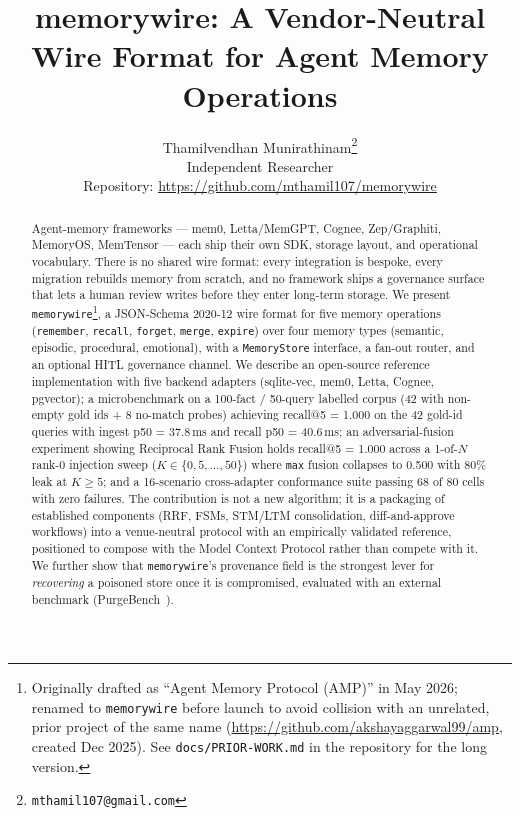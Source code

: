 \documentclass[11pt,letterpaper,twocolumn]{article}
\title{memorywire: A Vendor-Neutral Wire Format for Agent Memory Operations}
\author{
  Thamilvendhan Munirathinam\thanks{\texttt{mthamil107@gmail.com}}\\
  Independent Researcher\\
  \small{Repository: \url{https://github.com/mthamil107/memorywire}}
}
\date{}
\begin{document}
\maketitle

\begin{abstract}
Agent-memory frameworks --- mem0, Letta/MemGPT, Cognee, Zep/Graphiti, MemoryOS, MemTensor --- each ship their own SDK, storage layout, and operational vocabulary. There is no shared wire format: every integration is bespoke, every migration rebuilds memory from scratch, and no framework ships a governance surface that lets a human review writes before they enter long-term storage. We present \texttt{memorywire}\footnote{Originally drafted as ``Agent Memory Protocol (AMP)'' in May 2026; renamed to \texttt{memorywire} before launch to avoid collision with an unrelated, prior project of the same name (\url{https://github.com/akshayaggarwal99/amp}, created Dec 2025). See \texttt{docs/PRIOR-WORK.md} in the repository for the long version.}, a JSON-Schema 2020-12 wire format for five memory operations (\texttt{remember}, \texttt{recall}, \texttt{forget}, \texttt{merge}, \texttt{expire}) over four memory types (semantic, episodic, procedural, emotional), with a \texttt{MemoryStore} interface, a fan-out router, and an optional HITL governance channel. We describe an open-source reference implementation with five backend adapters (sqlite-vec, mem0, Letta, Cognee, pgvector); a microbenchmark on a 100-fact / 50-query labelled corpus (42 with non-empty gold ids + 8 no-match probes) achieving recall@5 = 1.000 on the 42 gold-id queries with ingest p50 = 37.8\,ms and recall p50 = 40.6\,ms; an adversarial-fusion experiment showing Reciprocal Rank Fusion holds recall@5 = 1.000 across a 1-of-$N$ rank-0 injection sweep ($K \in \{0,5,\dots,50\}$) where \texttt{max} fusion collapses to 0.500 with 80\% leak at $K \geq 5$; and a 16-scenario cross-adapter conformance suite passing 68 of 80 cells with zero failures. The contribution is not a new algorithm; it is a packaging of established components (RRF, FSMs, STM/LTM consolidation, diff-and-approve workflows) into a venue-neutral protocol with an empirically validated reference, positioned to compose with the Model Context Protocol rather than compete with it. We further show that \texttt{memorywire}'s provenance field is the strongest lever for \emph{recovering} a poisoned store once it is compromised, evaluated with an external benchmark (PurgeBench~\cite{purgebench}).
\end{abstract}
\end{document}
